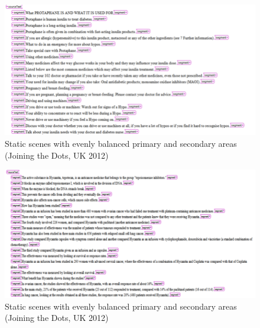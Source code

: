 \documentclass[output=paper]{langsci/langscibook}
\begin{document}
  
\begin{figure}
 \includegraphics[width=\textwidth]{figures/Sarto8.png}
 \caption{Static scenes with evenly balanced primary and secondary areas (Joining the Dots, UK 2012)}
 \label{sarto:fig:8}
\end{figure} 

\begin{figure}
 \includegraphics[width=\textwidth]{figures/Sarto9.png}
 \caption{Static scenes with evenly balanced primary and secondary areas (Joining the Dots, UK 2012)}
 \label{sarto:fig:9}
\end{figure} 
 




\printbibliography[heading=subbibliography,notkeyword=this]
\end{document}
